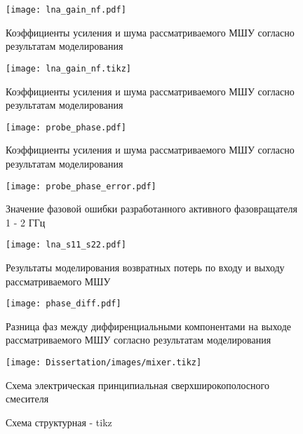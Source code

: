 \begin{figure}[ht]
	\centering
	\texttt{[image: lna\_gain\_nf.pdf]}
	
	\caption{Коэффициенты усиления и шума рассматриваемого МШУ согласно результатам моделирования}
	\label{ct:lna_gain_nf}
\end{figure}

\begin{figure}[ht]
	\centering
	\texttt{[image: lna\_gain\_nf.tikz]}
	
	\caption{Коэффициенты усиления и шума рассматриваемого МШУ согласно результатам моделирования}
	\label{ct:lna_gain_tikz}
\end{figure}

\begin{figure}[ht]
	\centering
	\texttt{[image: probe\_phase.pdf]}
	
	\caption{Коэффициенты усиления и шума рассматриваемого МШУ согласно результатам моделирования}
	\label{ct:ps_phase}
\end{figure}

\begin{figure}[ht]
	\centering
	\texttt{[image: probe\_phase\_error.pdf]}
	
	\caption{Значение фазовой ошибки разработанного активного фазовращателя 1 - 2 ГГц}
	\label{ct:ps_phase_error}
\end{figure}

\begin{figure}[ht]
	\centering
	\texttt{[image: lna\_s11\_s22.pdf]}
	
	\caption{Результаты моделирования возвратных потерь по входу и выходу рассматриваемого МШУ}
	\label{ct:lna_s11_s22}
\end{figure}

\begin{figure}[ht]
	\centering
	\texttt{[image: phase\_diff.pdf]}
	
	\caption{Разница фаз между диффиренциальными компонентами на выходе рассматриваемого МШУ согласно результатам моделирования}
	\label{ct:phase_diff}
\end{figure}

\begin{figure}[ht]
	\centering
	\texttt{[image: Dissertation/images/mixer.tikz]}
	
	\caption{Схема электрическая принципиальная сверхширокополосного смесителя}
	\label{ct:mixer_1_18}
\end{figure}

\begin{figure}[ht]
	\centering
	\resizebox{\linewidth}{!}{}
	
	\caption{Схема структурная - tikz}
	\label{ct:drawing}
\end{figure}

